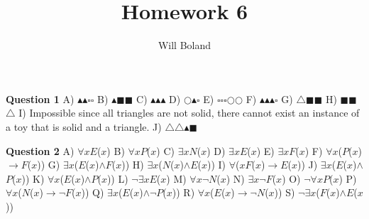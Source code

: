 \documentclass{article}
\begin{document}
\title{Homework 6}
\author{Will Boland}
\maketitle

\textbf{Question 1}\newline
A)	$\blacktriangle$$\blacktriangle$$\square$$\square$\newline
B)	$\blacktriangle$$\blacksquare$$\blacksquare$\newline
C)	$\blacktriangle$$\blacktriangle$$\blacktriangle$\newline
D)	$\mathbb{\bigcirc}$$\blacktriangle$$\square$\newline
E)	$\square$$\square$$\square$$\mathbb{\bigcirc}$$\mathbb{\bigcirc}$\newline
F)	$\blacktriangle$$\blacktriangle$$\blacktriangle$$\square$\newline
G)	$\triangle$$\blacksquare$$\blacksquare$\newline
H)	$\blacksquare$$\blacksquare$$\triangle$\newline
I)	Impossible since all triangles are not solid, there cannot exist an instance of a toy that is solid and a triangle.\newline
J)	$\triangle$$\triangle$$\blacktriangle$$\blacksquare$\newline\newline

\textbf{Question 2}\newline
A)	$\forall$$x$$E$($x$)\newline
B)	$\forall$$x$$P$($x$)\newline
C)	$\exists$$x$$N$($x$)\newline
D)	$\exists$$x$$E$($x$)\newline
E)	$\exists$$x$$F$($x$)\newline
F)	$\forall$$x$($P$($x$)$\rightarrow$$F$($x$))\newline
G)	$\exists$$x$($E$($x$)$\wedge$$F$($x$))\newline
H)	$\exists$$x$($N$($x$)$\wedge$$E$($x$))\newline
I)	$\forall$($x$$F$($x$)$\rightarrow$$E$($x$))\newline
J)	$\exists$$x$($E$($x$)$\wedge$$P$($x$))\newline
K)	$\forall$$x$($E$($x$)$\wedge$$P$($x$))\newline
L)	$\neg$$\exists$$x$$E$($x$)\newline
M)	$\forall$$x$$\neg$$N$($x$)\newline
N)	$\exists$$x$$\neg$$F$($x$)\newline
O)	$\neg$$\forall$$x$$P$($x$)\newline
P)	$\forall$$x$($N$($x$)$\rightarrow$$\neg$$F$($x$))\newline
Q)	$\exists$$x$($E$($x$)$\wedge$$\neg$$P$($x$))\newline
R)	$\forall$$x$($E$($x$)$\rightarrow$$\neg$$N$($x$))\newline
S)	$\neg$$\exists$$x$($F$($x$)$\wedge$$E$($x$))\newline\newline
\end{document}
